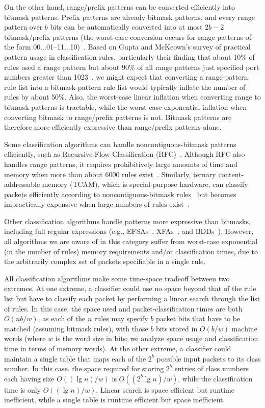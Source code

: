 \documentclass[10pt, conference, compsocconf]{IEEEtran}
\begin{document}
On the other hand, range/prefix patterns can be converted efficiently into
bitmask patterns.  Prefix patterns are already bitmask patterns, and every range
pattern over $b$ bits can be automatically converted into at most $2b{-}2$
bitmask/prefix patterns (the worst-case conversion occurs for range patterns of
the form 00...01--11...10)~\cite{cross-p}.  Based on Gupta and McKeown's survey
of practical pattern usage in classification rules, particularly their finding
that about 10\% of rules used a range pattern but about 90\% of all range
patterns just specified port numbers greater than 1023~\cite{pankaj+}, we might
expect that converting a range-pattern rule list into a bitmask-pattern rule
list would typically inflate the number of rules by about 50\%.  Also, the
worst-case linear inflation when converting range to bitmask patterns is
tractable, while the worst-case exponential inflation when converting bitmask to
range/prefix patterns is not.  Bitmask patterns are therefore more efficiently
expressive than range/prefix patterns alone.

Some classification algorithms can handle noncontiguous-bitmask patterns
efficiently, such as Recursive Flow Classification (RFC)~\cite{pankaj+}.
Although RFC also handles range patterns, it requires prohibitively large
amounts of time and memory when more than about 6000 rules exist~\cite{pankaj+}.
Similarly, ternary content-addressable memory (TCAM), which is special-purpose
hardware, can classify packets efficiently according to noncontiguous-bitmask
rules~\cite{dyn-multi} but becomes impractically expensive when large numbers of
rules exist~\cite{babo-journal,ch49}.

Other classification algorithms handle patterns more expressive than bitmasks,
including full regular expressions (e.g., EFSAs~\cite{efsa}, XFAs~\cite{xfa},
and BDDs~\cite{bdds}).  However, all algorithms we are aware of in this category
suffer from worst-case exponential (in the number of rules) memory requirements
and/or classification times, due to the arbitrarily complex set of packets
specifiable in a single rule.

All classification algorithms make some time-space tradeoff between two
extremes.  At one extreme, a classifier could use no space beyond that of the
rule list but have to classify each packet by performing a linear search through
the list of rules.  In this case, the space used and packet-classification times
are both $O(nb/w)$, as each of the $n$ rules may specify $b$ packet bits that
have to be matched (assuming bitmask rules), with those $b$ bits stored in
$O(b/w)$ machine words (where $w$ is the word size in bits; we analyze space
usage and classification time in terms of memory words).  At the other extreme,
a classifier could maintain a single table that maps each of the $2^b$ possible
input packets to its class
number. %
In this case, the space required for storing $2^b$ entries of class numbers each
having size $O((\lg n)/w)$ is $O((2^b\lg n)/w)$, while the classification time
is only $O((\lg n)/w)$.  Linear search is space efficient but runtime
inefficient, while a single table is runtime efficient but space inefficient.
\end{document}
